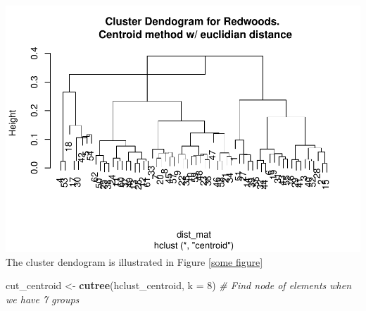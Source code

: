 \documentclass[
]{article}
\newenvironment{Shaded}{\begin{snugshade}}{\end{snugshade}}
\newcommand{\CommentTok}[1]{\textcolor[rgb]{0.56,0.35,0.01}{\textit{#1}}}
\newcommand{\DataTypeTok}[1]{\textcolor[rgb]{0.13,0.29,0.53}{#1}}
\newcommand{\DecValTok}[1]{\textcolor[rgb]{0.00,0.00,0.81}{#1}}
\newcommand{\KeywordTok}[1]{\textcolor[rgb]{0.13,0.29,0.53}{\textbf{#1}}}
\newcommand{\NormalTok}[1]{#1}
\newcommand{\OperatorTok}[1]{\textcolor[rgb]{0.81,0.36,0.00}{\textbf{#1}}}
\newcommand{\StringTok}[1]{\textcolor[rgb]{0.31,0.60,0.02}{#1}}
\begin{document}
\includegraphics{project2_files/figure-latex/unnamed-chunk-3-1.pdf} The
cluster dendogram is illustrated in Figure \ref{some figure}

\begin{Shaded}
\begin{Highlighting}[]
\NormalTok{cut_centroid <-}\StringTok{ }\KeywordTok{cutree}\NormalTok{(hclust_centroid, }\DataTypeTok{k =} \DecValTok{8}\NormalTok{) }\CommentTok{# Find node of elements when we have 7 groups}
\end{Highlighting}
\end{Shaded}

\begin{Shaded}
\end{Shaded}

\begin{Shaded}
\end{Shaded}
\end{document}
